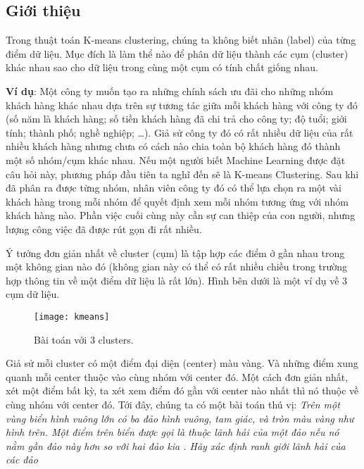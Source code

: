 \subsection{Giới thiệu}
Trong thuật toán K-means clustering, chúng ta không biết nhãn (label) của từng điểm dữ liệu. 
Mục đích là làm thể nào để phân dữ liệu thành các cụm (cluster) khác nhau sao cho dữ liệu trong cùng một cụm có tính chất giống nhau.
\par
\textbf{Ví dụ}: Một công ty muốn tạo ra những chính sách ưu đãi cho những nhóm khách hàng khác nhau dựa trên sự tương tác giữa mỗi khách hàng với công ty đó (số năm là khách hàng; số tiền khách hàng đã chi trả cho công ty; độ tuổi; giới tính; thành phố; nghề nghiệp; …). 
Giả sử công ty đó có rất nhiều dữ liệu của rất nhiều khách hàng nhưng chưa có cách nào chia toàn bộ khách hàng đó thành một số nhóm/cụm khác nhau. 
Nếu một người biết Machine Learning được đặt câu hỏi này, phương pháp đầu tiên ta nghĩ đến sẽ là K-means Clustering. 
Sau khi đã phân ra được từng nhóm, nhân viên công ty đó có thể lựa chọn ra một vài khách hàng trong mỗi nhóm để quyết định xem mỗi nhóm tương ứng với nhóm khách hàng nào. 
Phần việc cuối cùng này cần sự can thiệp của con người, nhưng lượng công việc đã được rút gọn đi rất nhiều.
\par
Ý tưởng đơn giản nhất về cluster (cụm) là tập hợp các điểm ở gần nhau trong một không gian nào đó (không gian này có thể có rất nhiều chiều trong trường hợp thông tin về một điểm dữ liệu là rất lớn). 
Hình bên dưới là một ví dụ về 3 cụm dữ liệu.
\begin{figure}[!htbp]
    \centering
    \texttt{[image: kmeans]}
    \caption{Bài toán với 3 clusters.}
    \label{fig:x cubed graph}
\end{figure}
\FloatBarrier
Giả sử mỗi cluster có một điểm đại diện (center) màu vàng. Và những điểm xung quanh mỗi center thuộc vào cùng nhóm với center đó. Một cách đơn giản nhất, xét một điểm bất kỳ, ta xét xem điểm đó gần với center nào nhất thì nó thuộc về cùng nhóm với center đó. Tới đây, chúng ta có một bài toán thú vị: \textit{Trên một vùng biển hình vuông lớn có ba đảo hình vuông, tam giác, và tròn màu vàng như hình trên. Một điểm trên biển được gọi là thuộc lãnh hải của một đảo nếu nó nằm gần đảo này hơn so với hai đảo kia . Hãy xác định ranh giới lãnh hải của các đảo}
